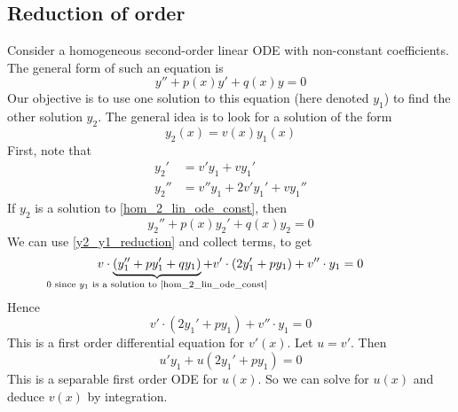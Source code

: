 \subsection{Reduction of order}
Consider a homogeneous second-order linear ODE with non-constant coefficients.
The general form of such an equation is
\begin{equation}\label{hom_2_lin_ode_const}
	y'' + p(x) y' + q(x) y = 0
\end{equation}
Our objective is to use one solution to this equation (here denoted \(y_1\)) to find the other solution \(y_2\).
The general idea is to look for a solution of the form
\begin{equation}\label{y2_y1_reduction}
	y_2(x) = v(x)y_1(x)
\end{equation}
First, note that
\begin{align*}
	y_2'  & = v'y_1 + vy_1'             \\
	y_2'' & = v''y_1 + 2v'y_1' + vy_1''
\end{align*}
If \(y_2\) is a solution to \eqref{hom_2_lin_ode_const}, then
\[
	y_2'' + p(x) y_2' + q(x) y_2 = 0
\]
We can use \eqref{y2_y1_reduction} and collect terms, to get
\[
	v\cdot\underbrace{(y_1'' + py_1' + qy_1)}_{\mathclap{\text{0 since \(y_1\) is a solution to \eqref{hom_2_lin_ode_const}}}} + v'\cdot(2y_1' + py_1) + v''\cdot y_1 = 0
\]
Hence
\[
	v'\cdot (2y_1' + py_1) + v'' \cdot y_1 = 0
\]
This is a first order differential equation for \(v'(x)\).
Let \(u=v'\).
Then
\[
	u'y_1 + u (2y_1' + py_1) = 0
\]
This is a separable first order ODE for \(u(x)\).
So we can solve for \(u(x)\) and deduce \(v(x)\) by integration.

